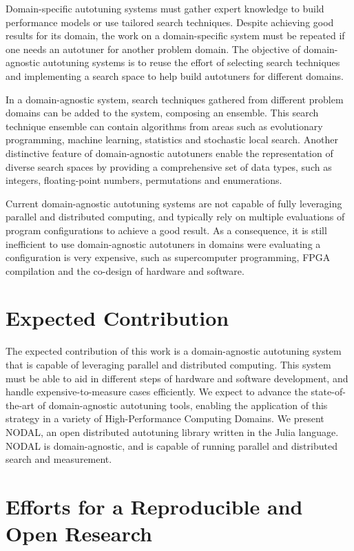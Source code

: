 Domain-specific autotuning systems must gather expert knowledge to build
performance models or use tailored search techniques.  Despite achieving good
results for its domain, the work on a domain-specific system must be repeated
if one needs an autotuner for another problem domain. The objective of
domain-agnostic autotuning systems is to reuse the effort of selecting search
techniques and implementing a search space to help build autotuners for
different domains.

In a domain-agnostic system, search techniques gathered from different problem
domains can be added to the system, composing an ensemble.  This search
technique ensemble can contain algorithms from areas such as evolutionary
programming, machine learning, statistics and stochastic local search.
Another distinctive feature of domain-agnostic autotuners enable
the representation of diverse search spaces by providing a comprehensive
set of data types, such as integers, floating-point numbers, permutations
and enumerations.

Current domain-agnostic autotuning systems are not capable of fully leveraging
parallel and distributed computing, and typically rely on multiple evaluations
of program configurations to achieve a good result. As a consequence, it is
still inefficient to use domain-agnostic autotuners in domains were evaluating
a configuration is very expensive, such as supercomputer programming, FPGA
compilation and the co-design of hardware and software.

\section{Expected Contribution}
\label{sec:contributions}

The expected contribution of this work is a domain-agnostic autotuning system
that is capable of leveraging parallel and distributed computing. This system
must be able to aid in different steps of hardware and software development,
and handle expensive-to-measure cases efficiently.  We expect to advance the
state-of-the-art of domain-agnostic autotuning tools, enabling the application
of this strategy in a variety of High-Performance Computing Domains.  We
present NODAL, an open distributed autotuning library written in the Julia
language. NODAL is domain-agnostic, and is capable of running parallel and
distributed search and measurement.

\section{Efforts for a Reproducible and Open Research}

